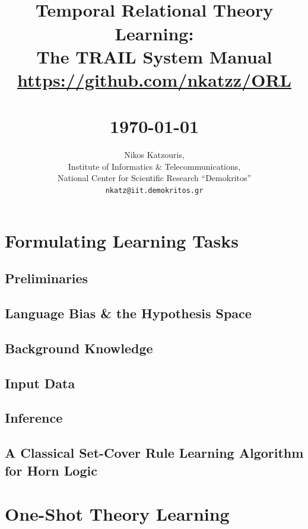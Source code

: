 \documentclass[a4paper,twoside,11pt]{article}
\title{	%
	\HRule{0.5pt} \\
	[0.5cm]						%
	\LARGE \textbf{Temporal Relational Theory Learning:\\ 
		The \textsf{TRAIL} System Manual}	\\
	[0.5cm]
	\large \url{https://github.com/nkatzz/ORL} \\
	\HRule{0.5pt} \\ [0.5cm]		%
	\normalsize \today			%
}
\author{
	\Large Nikos Katzouris,\\	
	\normalsize
	Institute of Informatics \& Telecommunications,\\	
	National Center for Scientific Research ``Demokritos''\\
	\texttt{nkatz@iit.demokritos.gr} \\
}
\makeatletter
\theoremstyle{definition}
\def\printtitle{%
	{\centering \@title\par}}
\def\printauthor{%
	{\centering \large \@author}}
\makeatother
\begin{document}
	

\thispagestyle{empty}		%

\printtitle					%
\vspace*{3cm}
\printauthor				%

\newpage
\pagestyle{plain} %
\tableofcontents
\listoffigures
\newpage








\section{Formulating Learning Tasks}
\subsection{Preliminaries}
\subsection{Language Bias \& the Hypothesis Space}
\subsection{Background Knowledge}
\subsection{Input Data}
\subsection{Inference}
\subsection{A Classical Set-Cover Rule Learning Algorithm for Horn Logic}
\section{One-Shot Theory Learning}
\end{document}
